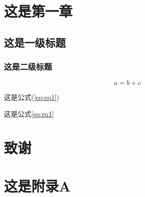 \documentclass[bachelor]{cugthesis}
\begin{document}
\makefrontpages
\chapter{这是第一章}
\section{这是一级标题}
\subsection{这是二级标题}

\begin{equation}
    a = b+c
    \label{eq:eq1}
\end{equation}

这是公式(\ref{eq:eq1})

这是公式\eqref{eq:eq1}


\backmatter
\chapter{致谢}

\appendix
\chapter{这是附录A}
\end{document}
